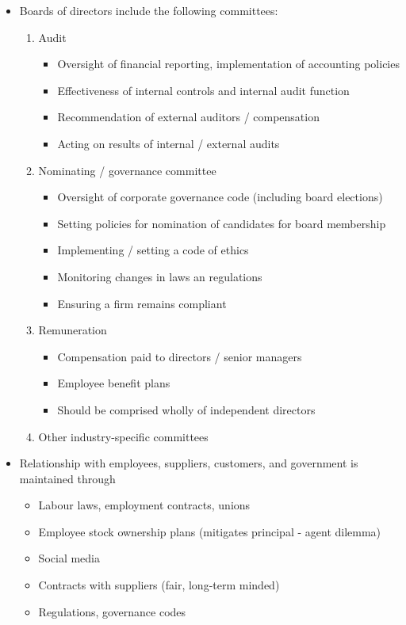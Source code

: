 \documentclass[../notes_compiled.tex]{subfiles}
\begin{document}
\begin{itemize}
\item Boards of directors include the following committees:
\begin{enumerate}
\item Audit
\begin{itemize}
\item Oversight of financial reporting, implementation of accounting policies
\item Effectiveness of internal controls and internal audit function
\item Recommendation of external auditors / compensation
\item Acting on results of internal / external audits
\end{itemize}
\item Nominating / governance committee
\begin{itemize}
\item Oversight of corporate governance code (including board elections)
\item Setting policies for nomination of candidates for board membership
\item Implementing / setting a code of ethics
\item Monitoring changes in laws an regulations
\item Ensuring a firm remains compliant
\end{itemize}
\item Remuneration
\begin{itemize}
\item Compensation paid to directors / senior managers
\item Employee benefit plans
\item Should be comprised wholly of independent directors
\end{itemize}
\item Other industry-specific committees
\end{enumerate}

\item Relationship with employees, suppliers, customers, and government is maintained through
\begin{itemize}
\item Labour laws, employment contracts, unions
\item Employee stock ownership plans (mitigates principal - agent dilemma)
\item Social media
\item Contracts with suppliers (fair, long-term minded)
\item Regulations, governance codes
\end{itemize}


\end{itemize}
\end{document}
